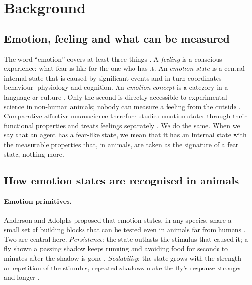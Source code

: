 \documentclass[11pt]{article}
\begin{document}
\section{Background}
\label{sec:background}

\subsection{Emotion, feeling and what can be measured}

The word ``emotion'' covers at least three things \cite{ledoux2012rethinking,adolphs2018neuroscience}. A \emph{feeling} is a conscious experience: what fear is like for the one who has it. An \emph{emotion state} is a central internal state that is caused by significant events and in turn coordinates behaviour, physiology and cognition. An \emph{emotion concept} is a category in a language or culture \cite{barrett2017emotions}. Only the second is directly accessible to experimental science in non-human animals; nobody can measure a feeling from the outside \cite{chalmers1995facing,nagel1974bat}. Comparative affective neuroscience therefore studies emotion states through their functional properties and treats feelings separately \cite{anderson2014framework,adolphs2018neuroscience}. We do the same. When we say that an agent has a fear-like state, we mean that it has an internal state with the measurable properties that, in animals, are taken as the signature of a fear state, nothing more.

\subsection{How emotion states are recognised in animals}

\paragraph{Emotion primitives.} Anderson and Adolphs proposed that emotion states, in any species, share a small set of building blocks that can be tested even in animals far from humans \cite{anderson2014framework}. Two are central here. \emph{Persistence}: the state outlasts the stimulus that caused it; a fly shown a passing shadow keeps running and avoiding food for seconds to minutes after the shadow is gone \cite{gibson2015behavioral}. \emph{Scalability}: the state grows with the strength or repetition of the stimulus; repeated shadows make the fly's response stronger and longer \cite{gibson2015behavioral}.
\end{document}
